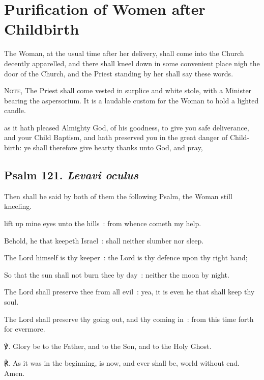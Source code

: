 \section{Purification of Women after Childbirth}
\fancyhead[RE,LO]{}
\begin{secrubric}
	The Woman, at the usual time after her delivery, shall come into the Church decently apparelled, and there shall kneel down in some convenient place nigh the door of the Church, and the Priest standing by her shall say these words.\par
	\textsc{Note,} The Priest shall come vested in surplice and white stole, with a Minister bearing the aspersorium. It is a laudable custom for the Woman to hold a lighted candle.
\end{secrubric}

 as it hath pleased Almighty God, of his goodness, to give you safe deliverance, and your Child Baptism, and hath preserved you in the great danger of Child-birth: ye shall therefore give hearty thanks unto God, and pray,

\subsection{Psalm 121. \textit{Levavi oculus}}

\begin{rubric}
	Then shall be said by both of them the following Psalm, the Woman still kneeling.
\end{rubric}

 lift up mine eyes unto the hills~: from whence cometh my help.\par
{}
Behold, he that keepeth Israel~: shall neither slumber nor sleep.\par
{}The Lord himself is thy keeper~: the Lord is thy defence upon thy right hand;\par
{}So that the sun shall not burn thee by day~: neither the moon by night.\par
{}The Lord shall preserve thee from all evil~: yea, it is even he that shall keep thy soul.\par
{}The Lord shall preserve thy going out, and thy coming in~: from this time forth for evermore.\par
℣. Glory be to the Father, and to the Son, and to the Holy Ghost.\par
℟. As it was in the beginning, is now, and ever shall be, world without end. Amen.\\

